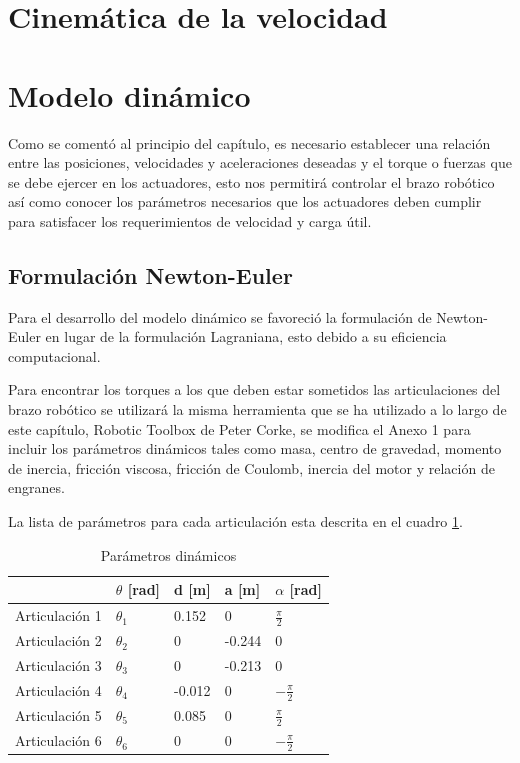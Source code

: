 \section{Cinemática de la velocidad}


\section{Modelo dinámico}

Como se comentó al principio del capítulo, es necesario establecer una relación entre las posiciones, velocidades y aceleraciones deseadas y el torque o fuerzas que se debe ejercer en los actuadores, esto nos permitirá controlar el brazo robótico así como conocer los parámetros necesarios que los actuadores deben cumplir para satisfacer los requerimientos de velocidad y carga útil.


\subsection{Formulación Newton-Euler}

Para el desarrollo del modelo dinámico se favoreció la formulación de Newton-Euler en lugar de la formulación Lagraniana, esto debido a su eficiencia computacional.

Para encontrar los torques a los que deben estar sometidos las articulaciones del brazo robótico se utilizará la misma herramienta que se ha utilizado a lo largo de este capítulo, Robotic Toolbox de Peter Corke, se modifica el Anexo 1 para incluir los parámetros dinámicos tales como masa, centro de gravedad, momento de inercia, fricción viscosa, fricción de Coulomb, inercia del motor y relación de engranes. 

La lista de parámetros para cada articulación esta descrita en el cuadro \ref{table:dynamics}.


\begin{table}[h]
\centering
\caption{Parámetros dinámicos}
 \label{table:dynamics}
\begin{tabular}{l|l|l|l|l|}
               & $\theta$ [rad] & d [m]    & a [m]   & $\alpha$ [rad]                        \\ 
\hline
Articulación 1 & $\theta_1$              & 0.152    & 0       & $\frac{\pi}{2}$   \\
Articulación 2 & $\theta_2$              & 0        & -0.244       & 0 \\
Articulación 3 & $\theta_3$                  & 0 & -0.213       & 0                                                  \\
Articulación 4 & $\theta_4$              & -0.012        & 0 & $-\frac{\pi}{2}$   \\
Articulación 5 & $\theta_5$                        & 0.085        & 0 & $\frac{\pi}{2}$  \\
Articulación 6 & $\theta_6$                           & 0        & 0  & $-\frac{\pi}{2}$                                                 
\end{tabular}
\end{table}

